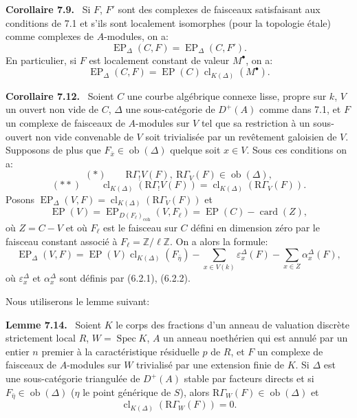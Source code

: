 \documentclass[11pt]{article}
\newenvironment{statement}[1]{\par\medskip\noindent\textbf{#1.}\ }{\par\medskip}
\DeclareMathOperator{\Spec}{Spec}
\providecommand{\EP}{\operatorname{EP}}
\providecommand{\coh}{\mathrm{coh}}
\providecommand{\Ob}{\operatorname{ob}}
\providecommand{\Ob}{\operatorname{ob}}
\providecommand{\Spec}{\operatorname{Spec}}
\providecommand{\EP}{\operatorname{EP}}
\providecommand{\Spec}{\operatorname{Spec}}
\providecommand{\Ob}{\operatorname{Ob}}
\providecommand{\coh}{\mathrm{coh}}
\providecommand{\clK}[1]{\operatorname{cl}_{K(#1)}}
\providecommand{\RG}{\mathrm R\Gamma}
\providecommand{\Spec}{\operatorname{Spec}}
\providecommand{\Ob}{\operatorname{ob}}
\providecommand{\Spec}{\operatorname{Spec}}
\providecommand{\Ob}{\operatorname{Ob}}
\begin{document}
\begin{statement}{Corollaire 7.9}
Si $F$, $F'$ sont des complexes de faisceaux satisfaisant aux conditions de 7.1 et s'ils sont localement isomorphes (pour la topologie étale) comme complexes de $A$-modules, on a:
\[
\EP_\Delta(C,F)=\EP_\Delta(C,F').
\tag{7.10}
\]
En particulier, si $F$ est localement constant de valeur $M^\bullet$, on a:
\[
\EP_\Delta(C,F)=\EP(C)\clK{\Delta}(M^\bullet).
\tag{7.11}
\]
\end{statement}

\begin{statement}{Corollaire 7.12}
Soient $C$ une courbe algébrique connexe lisse, propre sur $k$, $V$ un ouvert non vide de $C$, $\Delta$ une sous-catégorie de $D^+(A)$ comme dans 7.1, et $F$ un complexe de faisceaux de $A$-modules sur $V$ tel que sa restriction à un sous-ouvert non vide convenable de $V$ soit trivialisée par un revêtement galoisien de $V$. Supposons de plus que $F_{\bar x}\in\Ob(\Delta)$ quelque soit $x\in V$. Sous ces conditions on a:
\[
(*)\qquad \RG_!V(F),\ \RG_V(F)\in\Ob(\Delta),
\]
\[
(**)\qquad
\clK{\Delta}(\RG_!V(F))=\clK{\Delta}(\RG_V(F)).
\]
Posons $\EP_\Delta(V,F)=\clK{\Delta}(\RG_V(F))$ et
\[
\EP(V)=\EP_{D(F_\ell)_{\coh}}(V,F_\ell)=\EP(C)-\operatorname{card}(Z),
\]
où $Z=C-V$ et où $F_\ell$ est le faisceau sur $C$ défini en dimension zéro par le faisceau constant associé à $F_\ell=\mathbb Z/\ell\mathbb Z$. On a alors la formule:
\[
\EP_\Delta(V,F)
=
\EP(V)\clK{\Delta}(F_{\bar\eta})
-\sum_{x\in V(k)}\varepsilon_x^\Delta(F)
-\sum_{x\in Z}\alpha_x^\Delta(F),
\tag{7.13}
\]
où $\varepsilon_x^\Delta$ et $\alpha_x^\Delta$ sont définis par (6.2.1), (6.2.2).
\end{statement}

Nous utiliserons le lemme suivant:

\begin{statement}{Lemme 7.14}
Soient $K$ le corps des fractions d'un anneau de valuation discrète strictement local $R$, $W=\Spec K$, $A$ un anneau noethérien qui est annulé par un entier $n$ premier à la caractéristique résiduelle $p$ de $R$, et $F$ un complexe de faisceaux de $A$-modules sur $W$ trivialisé par une extension finie de $K$. Si $\Delta$ est une sous-catégorie triangulée de $D^+(A)$ stable par facteurs directs et si $F_{\bar\eta}\in\Ob(\Delta)$ ($\eta$ le point générique de $S$), alors $\RG_W(F)\in\Ob(\Delta)$ et
\[
\clK{\Delta}(\RG_W(F))=0.
\]
\end{statement}
\end{document}

